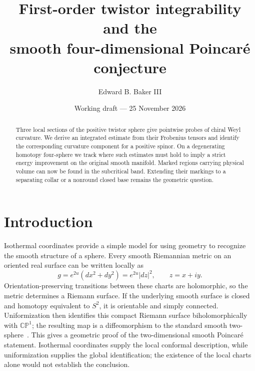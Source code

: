 \documentclass[11pt]{article}
\title{First-order twistor integrability and the\\
smooth four-dimensional Poincar\'e conjecture}
\author{Edward B. Baker III}
\date{Working draft --- 25 November 2026}
\numberwithin{equation}{section}
\newcommand{\CP}{\mathbb{CP}}
\begin{document}
\maketitle
\thispagestyle{plain}

\begin{abstract}
Three local sections of the positive twistor sphere give pointwise probes
of chiral Weyl curvature. We derive an integrated estimate from their
Frobenius tensors and identify the corresponding curvature component for a
positive spinor. On a degenerating homotopy four-sphere we track where
such estimates must hold to imply a strict energy improvement on the
original smooth manifold. Marked regions carrying physical volume can now
be found in the subcritical band. Extending their markings to a separating
collar or a nonround closed base remains the geometric question.
\end{abstract}

\section{Introduction}\label{sec:introduction}

Isothermal coordinates provide a simple model for using geometry to
recognize the smooth structure of a sphere. Every smooth Riemannian metric
on an oriented real surface can be written locally as
\[
 g=e^{2u}(dx^2+dy^2)=e^{2u}|dz|^2,\qquad z=x+iy.
\]
Orientation-preserving transitions between these charts are holomorphic,
so the metric determines a Riemann surface. If the underlying smooth
surface is closed and homotopy equivalent to \(S^2\), it is orientable
and simply connected. Uniformization then identifies this compact Riemann
surface biholomorphically with \(\CP^1\); the resulting map is a
diffeomorphism to the standard smooth two-sphere~\cite{Donaldson2011}.
This gives a geometric proof of the two-dimensional smooth Poincar\'e
statement. Isothermal coordinates supply the local conformal description,
while uniformization supplies the global identification; the existence of
the local charts alone would not establish the conclusion.
\end{document}
